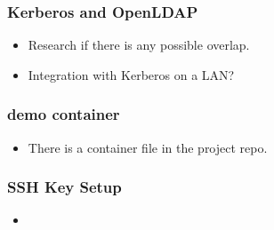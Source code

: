 \documentclass[aspectratio=169]{beamer}
\begin{document}
\begin{frame}
	\frametitle{Kerberos and OpenLDAP}
	\begin{itemize}
		\item Research if there is any possible overlap.
		\item Integration with Kerberos on a LAN?
	\end{itemize}
\end{frame}

\begin{frame}
    \frametitle{demo container}
    \begin{itemize}
        \item There is a container file in the project repo.
    \end{itemize}
\end{frame}

\begin{frame}
	\frametitle{SSH Key Setup}
	\begin{itemize}
		\item
	\end{itemize}
\end{frame}
\end{document}
